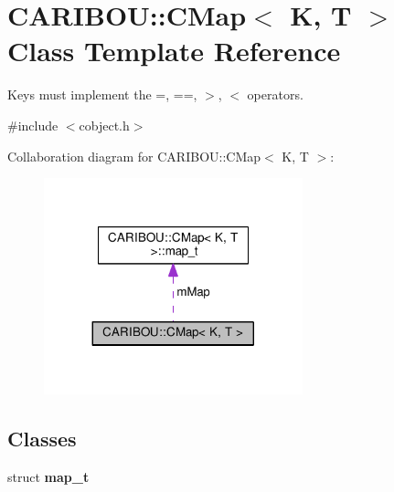 \section{C\+A\+R\+I\+B\+OU\+:\+:C\+Map$<$ K, T $>$ Class Template Reference}
\label{class_c_a_r_i_b_o_u_1_1_c_map}


Keys must implement the =, ==, $>$, $<$ operators.  




{\ttfamily \#include $<$cobject.\+h$>$}



Collaboration diagram for C\+A\+R\+I\+B\+OU\+:\+:C\+Map$<$ K, T $>$\+:\nopagebreak
\begin{figure}[H]
\begin{center}
\leavevmode
\includegraphics[width=212pt]{class_c_a_r_i_b_o_u_1_1_c_map__coll__graph}
\end{center}
\end{figure}
\subsection*{Classes}
\begin{DoxyCompactItemize}
\item 
struct {\bf map\+\_\+t}
\end{DoxyCompactItemize}
